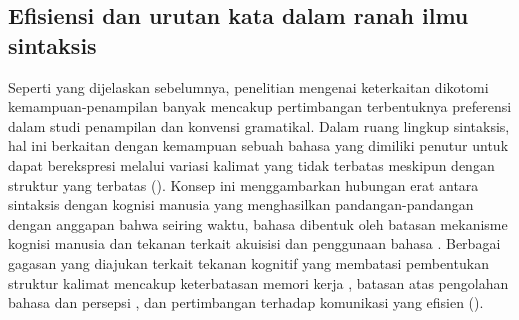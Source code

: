 \subsection{Efisiensi dan urutan kata dalam ranah ilmu sintaksis}
Seperti yang dijelaskan sebelumnya, penelitian mengenai keterkaitan dikotomi kemampuan-penampilan banyak mencakup pertimbangan terbentuknya preferensi dalam studi penampilan dan konvensi gramatikal. Dalam ruang lingkup sintaksis, hal ini berkaitan dengan kemampuan sebuah bahasa yang dimiliki penutur untuk dapat berekspresi melalui variasi kalimat yang tidak terbatas meskipun dengan struktur yang terbatas (\citealp{von1972origin, plotkin2000language}). Konsep ini menggambarkan hubungan erat antara sintaksis dengan kognisi manusia yang menghasilkan pandangan-pandangan dengan anggapan bahwa seiring waktu, bahasa dibentuk oleh batasan mekanisme kognisi manusia dan tekanan terkait akuisisi dan penggunaan bahasa \citep{plotkin2000language}. Berbagai gagasan yang diajukan terkait tekanan kognitif yang membatasi pembentukan struktur kalimat mencakup keterbatasan memori kerja \citep{slobin1973cognitive}, batasan atas pengolahan bahasa dan persepsi \citep{bever1970cognitive}, dan pertimbangan terhadap komunikasi yang efisien (\citealp{macwhinneybates1989cross, givon1991markedness, zipf1949human}). 

